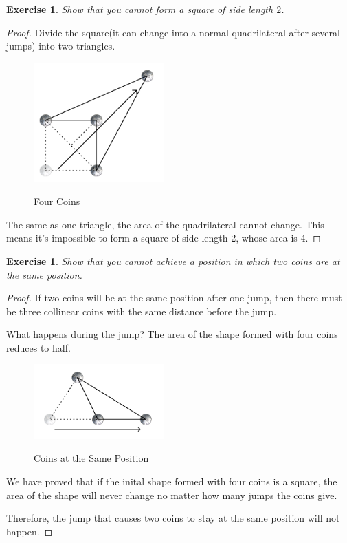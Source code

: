 \documentclass[12pt,a4]{article}
\theoremstyle{exercise}
\newtheorem{exercise}[theorem]{Exercise}
\begin{document}
\begin{exercise}
    Show that you cannot form a square of side length $2$.
\end{exercise}

\begin{proof}
    Divide the square(it can change into a normal quadrilateral after several jumps) into two triangles.

    \begin{figure}[H]
        \small
        \centering
        \includegraphics[width=5cm]{fourcoins.png}
        \label{fig:fourCoins}
	\caption{Four Coins}
    \end{figure}

    The same as one triangle, the area of the quadrilateral cannot change.
    This means it's impossible to form a square of side length 2, whose area is 4.

\end{proof}

\begin{exercise}
    Show that you cannot achieve a position in which two coins are at the same position.
\end{exercise}

\begin{proof}
    If two coins will be at the same position after one jump, then there must be three collinear coins with the same distance before the jump.

    What happens during the jump? The area of the shape formed with four coins reduces to half.

    \begin{figure}[H]
        \small
        \centering
        \includegraphics[width=5cm]{coinssameposition.png}
        \label{fig:coinsSamePosition}
        \caption{Coins at the Same Position}
    \end{figure}

    We have proved that if the inital shape formed with four coins is a square, the area of the shape will never change no matter how many jumps the coins give.

    Therefore, the jump that causes two coins to stay at the same position will not happen.

\end{proof}
\end{document}
